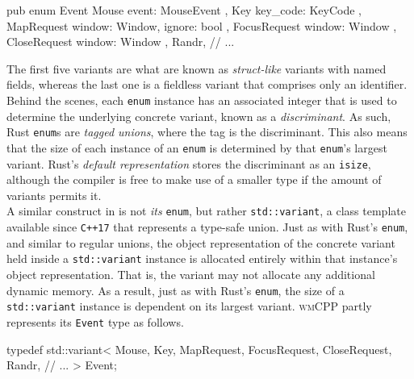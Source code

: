 \begin{rustblock}
  pub enum Event {
    Mouse { event: MouseEvent },
    Key { key_code: KeyCode },
    MapRequest { window: Window, ignore: bool },
    FocusRequest { window: Window },
    CloseRequest { window: Window },
    Randr,
    // ...
  }
\end{rustblock}

The   first  five   variants  are   what  are   known  as   \textit{struct-like}
variants   with  named   fields,   whereas   the  last   one   is  a   fieldless
variant  that   comprises  only  an   identifier\cite{therustreference}.  Behind
the   scenes,   each   \texttt{enum}  instance   has   an   associated
integer   that  is   used  to   determine  the   underlying  concrete   variant,
known   as  a   \textit{discriminant}\cite{therustreference}.   As  such,   Rust
\texttt{enum}s  are  \textit{tagged  unions},  where the  tag  is  the
discriminant.  This   also  means  that  the   size  of  each  instance   of  an
\texttt{enum} is determined  by that \texttt{enum}'s largest
variant. Rust's  \textit{default representation}  stores the discriminant  as an
\texttt{isize}, although the compiler is free to make use of a smaller
type if the amount of variants permits it\cite{therustreference}.\\


A  similar  construct  in   \cpp  is  not  \textit{its}  \texttt{enum},
but   rather   \texttt{std::variant},   a  class   template   available
since  \texttt{C++17}  that  represents  a  type-safe  union\cite{cppstd}.  Just
as  with   Rust's  \texttt{enum},  and  similar   to  regular  unions,
the   object   representation   of   the  concrete   variant   held   inside   a
\texttt{std::variant}  instance  is   allocated  entirely  within  that
instance's  object representation\cite{cppstd}.  That  is, the  variant may  not
allocate any additional  dynamic memory\cite{cppstd}. As a result,  just as with
Rust's  \texttt{enum}, the  size  of a  \texttt{std::variant}
instance is dependent on its largest variant\cite{cppstd}. \textsc{wmCPP} partly
represents its \texttt{Event} type as follows.

\begin{cppblock}
  typedef std::variant<
    Mouse,
    Key,
    MapRequest,
    FocusRequest,
    CloseRequest,
    Randr,
    // ...
  > Event;
\end{cppblock}

